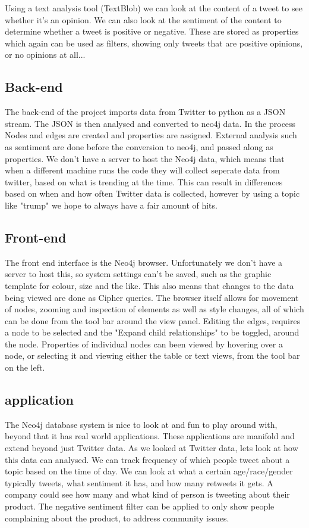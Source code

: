 \documentclass[11pt]{article}
\begin{document}
Using a text analysis tool (TextBlob) we can look at the content of a tweet to see whether it's an opinion. We can also look at the sentiment of the content to determine whether a tweet is positive or negative. These are stored as properties which again can be used as filters, showing only tweets that are positive opinions, or no opinions at all...

\subsection{Back-end}
The back-end of the project imports data from Twitter to python as a JSON stream. The JSON is then analysed and converted to neo4j data. In the process Nodes and edges are created and properties are assigned. External analysis such as sentiment are done before the conversion to neo4j, and passed along as properties.
We don't have a server to host the Neo4j data, which means that when a different machine runs the code they will collect seperate data from twitter, based on what is trending at the time. This can result in differences based on when and how often Twitter data is collected, however by using a topic like "trump" we hope to always have a fair amount of hits.\newline

\subsection{Front-end}
The front end interface is the Neo4j browser. Unfortunately we don't have a server to host this, so system settings can't be saved, such as the graphic template for colour, size and the like. This also means that changes to the data being viewed are done as Cipher queries. The browser itself allows for movement of nodes, zooming and inspection of elements as well as style changes, all of which can be done from the tool bar around the view panel. Editing the edges, requires a node to be selected and the "Expand child relationships" to be toggled, around the node. Properties of individual nodes can been viewed by hovering over a node, or selecting it and viewing either the table or text views, from the tool bar on the left.

\subsection{application}
The Neo4j database system is nice to look at and fun to play around with, beyond that it has real world applications. These applications are manifold and extend beyond just Twitter data. As we looked at Twitter data, lets look at how this data can analysed. We can track frequency of which people tweet about a topic based on the time of day. We can look at what a certain age/race/gender typically tweets, what sentiment it has, and how many retweets it gets. A company could see how many and what kind of person is tweeting about their product. The negative sentiment filter can be applied to only show people complaining about the product, to address community issues.
\end{document}
